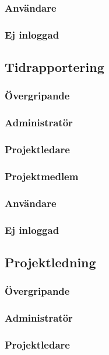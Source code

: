 \documentclass[a4paper]{article}
\begin{document}
		\subsubsection*{Användare}
		\subsubsection*{Ej inloggad}

	\subsection{Tidrapportering}
		\label{krav-funk-tid}
		\subsubsection*{Övergripande}
		\subsubsection*{Administratör}
		\subsubsection*{Projektledare}
		\subsubsection*{Projektmedlem}
		\subsubsection*{Användare}
		\subsubsection*{Ej inloggad}


	\subsection{Projektledning}
		\label{krav-funk-proj}
		\subsubsection*{Övergripande}
		\subsubsection*{Administratör}
		\subsubsection*{Projektledare}
\end{document}
